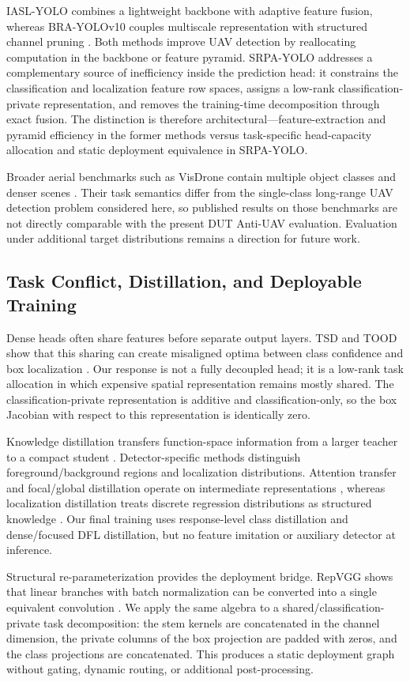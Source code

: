IASL-YOLO combines a lightweight backbone with adaptive feature fusion, whereas BRA-YOLOv10 couples multiscale representation with structured channel pruning \cite{yang2025iasl,zhang2025brayolo}. Both methods improve UAV detection by reallocating computation in the backbone or feature pyramid. SRPA-YOLO addresses a complementary source of inefficiency inside the prediction head: it constrains the classification and localization feature row spaces, assigns a low-rank classification-private representation, and removes the training-time decomposition through exact fusion. The distinction is therefore architectural---feature-extraction and pyramid efficiency in the former methods versus task-specific head-capacity allocation and static deployment equivalence in SRPA-YOLO.

Broader aerial benchmarks such as VisDrone contain multiple object classes and denser scenes \cite{zhu2018visdrone}. Their task semantics differ from the single-class long-range UAV detection problem considered here, so published results on those benchmarks are not directly comparable with the present DUT Anti-UAV evaluation. Evaluation under additional target distributions remains a direction for future work.

\subsection{Task Conflict, Distillation, and Deployable Training}
Dense heads often share features before separate output layers. TSD and TOOD show that this sharing can create misaligned optima between class confidence and box localization \cite{wu2020tsd,feng2021tood}. Our response is not a fully decoupled head; it is a low-rank task allocation in which expensive spatial representation remains mostly shared. The classification-private representation is additive and classification-only, so the box Jacobian with respect to this representation is identically zero.

Knowledge distillation transfers function-space information from a larger teacher to a compact student \cite{hinton2015distilling}. Detector-specific methods distinguish foreground/background regions and localization distributions. Attention transfer and focal/global distillation operate on intermediate representations \cite{zhang2018attentiontransfer,yang2022fgd}, whereas localization distillation treats discrete regression distributions as structured knowledge \cite{zheng2022ld}. Our final training uses response-level class distillation and dense/focused DFL distillation, but no feature imitation or auxiliary detector at inference.

Structural re-parameterization provides the deployment bridge. RepVGG shows that linear branches with batch normalization can be converted into a single equivalent convolution \cite{ding2021repvgg}. We apply the same algebra to a shared/classification-private task decomposition: the stem kernels are concatenated in the channel dimension, the private columns of the box projection are padded with zeros, and the class projections are concatenated. This produces a static deployment graph without gating, dynamic routing, or additional post-processing.

